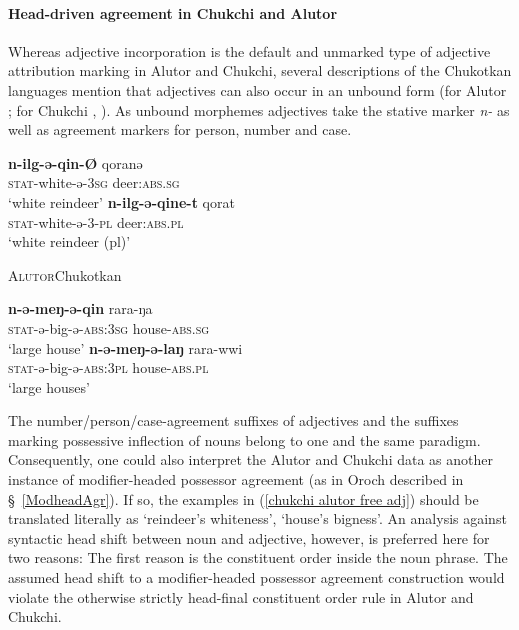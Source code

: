\paragraph{Head-driven agreement in Chukchi and Alutor}
Whereas adjective incorporation is the default and unmarked type of adjective attribution marking in Alutor and Chukchi, several descriptions of the Chukotkan languages mention that adjectives can also occur in an unbound form (for Alutor \citealt{nagayama2003}; for Chukchi \citealt[103–104, 421–429]{skorik1960}, \citealt[251]{comrie1981}). As unbound morphemes adjectives take the stative marker \textit{n-} as well as agreement markers for person, number and case.
\begin{exe}
\ex \label{chukchi alutor free adj}
\begin{xlist}
\ex {}
\begin{xlist}
\ex
\gll	\textbf{n-ilg-ə-qin-Ø} qoranə\\
	\textsc{stat}-white-ə-\textsc{3sg} deer:\textsc{abs.sg}\\
\glt	‘white reindeer’
\ex
\gll	\textbf{n-ilg-ə-qine-t} qorat\\
	\textsc{stat}-white-ə-3-\textsc{pl} deer:\textsc{abs.pl}\\
\glt	‘white reindeer (pl)’
\end{xlist}
\ex \textsc{Alutor}{Chukotkan}{\cite{nagayama2003}}
\begin{xlist}
\ex
\gll	\textbf{n-ə-meŋ-ə-qin} rara-ŋa\\
	\textsc{stat}-ə-big-ə-\textsc{abs:3sg} house-\textsc{abs.sg}\\
\glt	‘large house’
\ex
\gll	\textbf{n-ə-meŋ-ə-laŋ} rara-wwi\\
	\textsc{stat}-ə-big-ə-\textsc{abs:3pl} house-\textsc{abs.pl}\\
\glt	‘large houses’
\end{xlist}
\end{xlist}
\end{exe}
The number/person/case-agreement suffixes of adjectives and the suffixes marking possessive inflection of nouns belong to one and the same paradigm. Consequently, one could also interpret the Alutor and Chukchi data as another instance of modifier-headed possessor agreement (as in Oroch described in \S~\ref{ModheadAgr}). If so, the examples in (\ref{chukchi alutor free adj}) should be translated literally as ‘reindeer's whiteness’, ‘house's bigness’. An analysis against syntactic head shift between noun and adjective, however, is preferred here for two reasons: The first reason is the constituent order inside the noun phrase. The assumed head shift to a modifier-headed possessor agreement construction would violate the otherwise strictly head-final constituent order rule in Alutor and Chukchi. 

